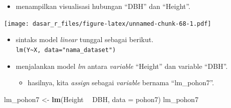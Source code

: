 \documentclass[
  12pt,
  a4paper,
]{scrbook}
\newenvironment{Shaded}{\begin{snugshade}}{\end{snugshade}}
\newcommand{\DataTypeTok}[1]{\textcolor[rgb]{0.13,0.29,0.53}{#1}}
\newcommand{\DecValTok}[1]{\textcolor[rgb]{0.00,0.00,0.81}{#1}}
\newcommand{\FloatTok}[1]{\textcolor[rgb]{0.00,0.00,0.81}{#1}}
\newcommand{\KeywordTok}[1]{\textcolor[rgb]{0.13,0.29,0.53}{\textbf{#1}}}
\newcommand{\NormalTok}[1]{#1}
\newcommand{\OperatorTok}[1]{\textcolor[rgb]{0.81,0.36,0.00}{\textbf{#1}}}
\newcommand{\StringTok}[1]{\textcolor[rgb]{0.31,0.60,0.02}{#1}}
\providecommand{\tightlist}{%
  \setlength{\itemsep}{0pt}\setlength{\parskip}{0pt}}
\begin{document}
\begin{itemize}
\tightlist
\item
  menampilkan visualisasi hubungan ``DBH'' dan ``Height''.
\end{itemize}

\begin{Shaded}
\end{Shaded}

\texttt{[image: dasar\_r\_files/figure-latex/unnamed-chunk-68-1.pdf]}

\begin{itemize}
\tightlist
\item
  sintaks model \emph{linear} tunggal sebagai berikut.\\
  \texttt{lm(Y\textasciitilde{}X,\ data="nama\_dataset")}
\end{itemize}

\newpage

\begin{itemize}
\tightlist
\item
  menjalankan model \emph{lm} antara \emph{variable} ``Height'' dan
  variable ``DBH''.

  \begin{itemize}
  \tightlist
  \item
    hasilnya, kita \emph{assign} sebagai \emph{variable} bernama
    ``lm\_pohon7''.
  \end{itemize}
\end{itemize}

\begin{Shaded}
\begin{Highlighting}[]
\NormalTok{lm_pohon7 <-}\StringTok{ }\KeywordTok{lm}\NormalTok{(Height }\OperatorTok{~}\StringTok{ }\NormalTok{DBH, }\DataTypeTok{data =}\NormalTok{ pohon7)}
\NormalTok{lm_pohon7}
\end{Highlighting}
\end{Shaded}
\end{document}
